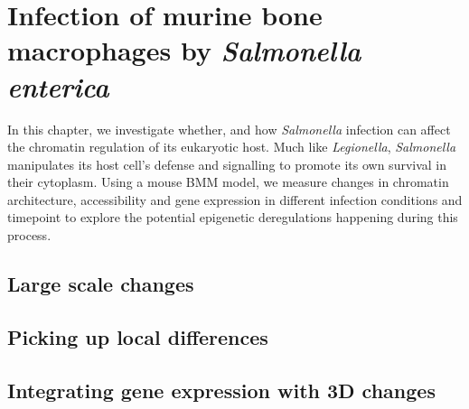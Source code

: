 \textsc{}%

\chapter{Infection of murine bone macrophages by \textit{Salmonella enterica}} %

\label{ch:02-03} %


In this chapter, we investigate whether, and how \textit{Salmonella} infection can affect the chromatin regulation of its eukaryotic host. Much like \textit{Legionella}, \textit{Salmonella} manipulates its host cell's defense and signalling to promote its own survival in their cytoplasm. Using a mouse \acrfull{BMM} model, we measure changes in chromatin architecture, accessibility and gene expression in different infection conditions and timepoint to explore the potential epigenetic deregulations happening during this process.

\section{Large scale changes}

\section{Picking up local differences}

\section{Integrating gene expression with 3D changes}

\blindtext